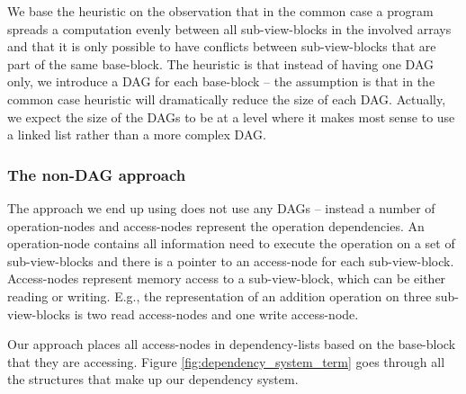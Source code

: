 \documentclass{acm_proc_article-sp}
\begin{document}
We base the heuristic on the observation that in the common case a program spreads a computation evenly between all sub-view-blocks in the involved arrays and that it is only possible to have conflicts between sub-view-blocks that are part of the same base-block. The heuristic is that instead of having one DAG only, we introduce a DAG for each base-block -- the assumption is that in the common case heuristic will dramatically reduce the size of each DAG. Actually, we expect the size of the DAGs to be at a level where it makes most sense to use a linked list rather than a more complex DAG.


\subsubsection{The non-DAG approach}
The approach we end up using does not use any DAGs -- instead a number of operation-nodes and access-nodes represent the operation dependencies. An operation-node contains all information need to execute the operation on a set of sub-view-blocks and there is a pointer to an access-node for each sub-view-block. Access-nodes represent memory access to a sub-view-block, which can be either reading or writing. E.g., the representation of an addition operation on three sub-view-blocks is two read access-nodes and one write access-node. 

Our approach places all access-nodes in dependency-lists based on the base-block that they are accessing. Figure \ref{fig:dependency_system_term} goes through all the structures that make up our dependency system.

\end{document}
